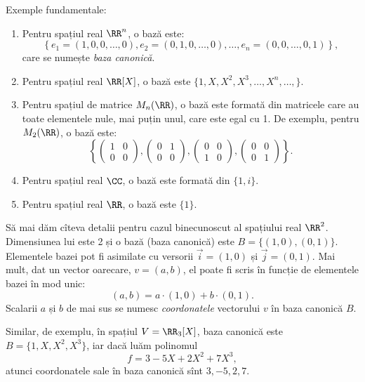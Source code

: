 Exemple fundamentale:
\begin{enumerate}
    \item Pentru spațiul real $ \RR^n $, o bază este:
        \[
            \left\{ e_1 = (1, 0, 0, \dots, 0), e_2 = (0, 1, 0, \dots, 0), \dots, %
            e_n = (0, 0, \dots, 0, 1) \right\},
        \]
        care se numește \emph{baza canonică}.
    \item Pentru spațiul real $ \RR[X] $, o bază este $ \{ 1, X, X^2, X^3, \dots, X^n, \dots, \} $.
    \item Pentru spațiul de matrice $ M_n(\RR) $, o bază este formată din matricele
        care au toate elementele nule, mai puțin unul, care este egal cu 1. De exemplu,
        pentru $ M_2(\RR) $, o bază este:
        \[
            \left\{ \begin{pmatrix} 1 & 0 \\ 0 & 0 \end{pmatrix},
                \begin{pmatrix} 0 & 1 \\ 0 & 0 \end{pmatrix},
                \begin{pmatrix} 0 & 0 \\ 1 & 0 \end{pmatrix},
            \begin{pmatrix} 0 & 0 \\ 0 & 1 \end{pmatrix} \right\}.
        \]
    \item Pentru spațiul real $ \CC $, o bază este formată din $ \{ 1, i \} $.
    \item Pentru spațiul real $ \RR $, o bază este $ \{ 1 \} $.
    \end{enumerate}

Să mai dăm cîteva detalii pentru cazul binecunoscut al spațiului real $ \RR^2 $.
Dimensiunea lui este 2 și o bază (baza canonică) este $ B = \{ (1, 0), (0, 1) \} $.
Elementele bazei pot fi asimilate cu versorii $ \vec{i} = (1, 0) $ și $ \vec{j} = (0, 1) $.
Mai mult, dat un vector oarecare, $ v = (a, b) $, el poate fi scris în funcție de elementele
bazei în mod unic:
\[
    (a, b) = a \cdot (1, 0) + b \cdot (0, 1).
\]
Scalarii $ a $ și $ b $ de mai sus se numesc \emph{coordonatele} vectorului $ v $ în
baza canonică $ B $.

Similar, de exemplu, în spațiul $ V = \RR_3[X] $, baza canonică este
$ B = \{ 1, X, X^2, X^3 \} $, iar dacă luăm polinomul
\[
    f = 3 - 5X + 2X^2 + 7X^3,
\]
atunci coordonatele sale în baza canonică sînt $ 3, -5, 2, 7 $.

